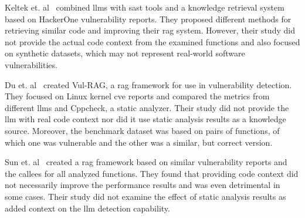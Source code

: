 Keltek et. al~\cite{keltek2024boostingcybersecurityvulnerabilityscanning} combined \acp{llm} with \ac{sast} tools and a knowledge retrieval system based on HackerOne vulnerability reports. They proposed different methods for retrieving similar code and improving their \ac{rag} system. However, their study did not provide the actual code context from the examined functions and also focused on synthetic datasets, which may not represent real-world software vulnerabilities.

Du et. al~\cite{du2024vulragenhancingllmbasedvulnerability} created Vul-RAG, a \ac{rag} framework for use in vulnerability detection. They focused on Linux kernel \ac{cve} reports and compared the metrics from different \acp{llm} and Cppcheck, a static analyzer. Their study did not provide the \ac{llm} with real code context nor did it use static analysis results as a knowledge source. Moreover, the benchmark dataset was based on pairs of functions, of which one was vulnerable and the other was a similar, but correct version.

Sun et. al~\cite{sun2025llm4vulnunifiedevaluationframework} created a \ac{rag} framework based on similar vulnerability reports and the callees for all analyzed functions. They found that providing code context did not necessarily improve the performance results and was even detrimental in some cases. Their study did not examine the effect of static analysis results as added context on the \ac{llm} detection capability.
